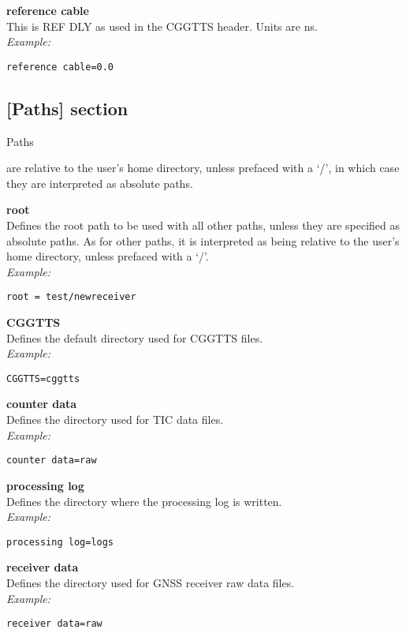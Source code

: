 {\bfseries reference cable}\\
This is REF DLY as used in the CGGTTS header. Units are ns.\\
\textit{Example:}
\begin{lstlisting}
reference cable=0.0
\end{lstlisting}

\subsection{[Paths] section}

\hypertarget{h:paths}{Paths} are relative to the user's home directory, unless prefaced with a `/', in which case
they are interpreted as absolute paths.

{\bfseries root}\\
Defines the root path to be used with all other paths, unless they are specified as absolute paths.
As for other paths, it is interpreted as being relative to the user's home directory, unless prefaced with a `/'.\\
\textit{Example:}
\begin{lstlisting}
root = test/newreceiver
\end{lstlisting}

{\bfseries CGGTTS}\\
Defines the default directory used for CGGTTS files.\\
\textit{Example:}
\begin{lstlisting}
CGGTTS=cggtts
\end{lstlisting}

{\bfseries counter data}\\
Defines the directory used for TIC data files.\\
\textit{Example:}
\begin{lstlisting}
counter data=raw
\end{lstlisting}

{\bfseries processing log}\\
Defines the directory where the  processing log is written.\\
\textit{Example:}
\begin{lstlisting}
processing log=logs
\end{lstlisting}

{\bfseries receiver data}\\
Defines the directory used for GNSS receiver raw data files.\\
\textit{Example:}
\begin{lstlisting}
receiver data=raw
\end{lstlisting}

